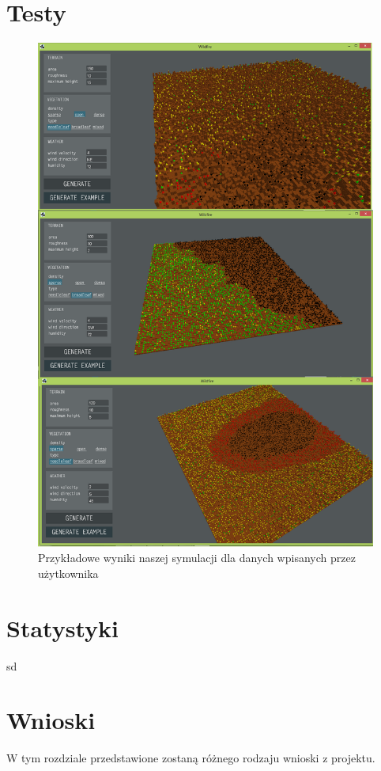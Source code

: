 \documentclass[a4paper, 11pt]{article}
\begin{document}
	\section{Testy}
	\indent
	\begin{figure}[H]
		\centerline{\includegraphics[scale=0.4]{generatetest}}
		\raggedright{	\caption{Przykładowe wyniki naszej symulacji dla danych wpisanych przez użytkownika}}
	\end{figure}
	
	\section*{Statystyki}
	\indent
	sd
	\section{Wnioski}
	\indent
		W tym rozdziale przedstawione zostaną różnego rodzaju wnioski z projektu.
\end{document}
